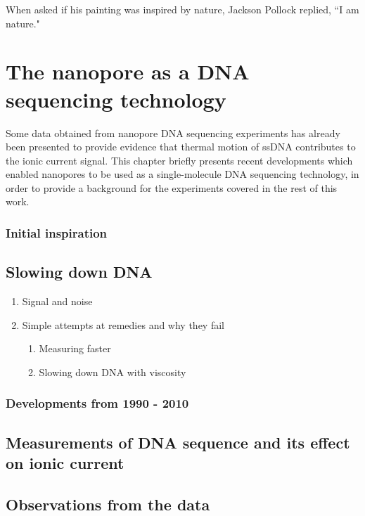 \begin{savequote}[75mm]
When asked if his painting was inspired by nature, Jackson Pollock replied, ``I am nature."
\end{savequote}

\chapter{The nanopore as a DNA sequencing technology}
\label{dna_sequencing}

Some data obtained from nanopore DNA sequencing experiments has already been presented to provide evidence that thermal motion of ssDNA contributes to the ionic current signal.  This chapter briefly presents recent developments which enabled nanopores to be used as a single-molecule DNA sequencing technology, in order to provide a background for the experiments covered in the rest of this work.

\subsection{Initial inspiration}

\section{Slowing down DNA}
\begin{enumerate}
\item Signal and noise
\item Simple attempts at remedies and why they fail
\begin{enumerate}
\item Measuring faster
\item Slowing down DNA with viscosity
\end{enumerate}
\end{enumerate}

\subsection{Developments from 1990 - 2010}

\section{Measurements of DNA sequence and its effect on ionic current}

\section{Observations from the data}

